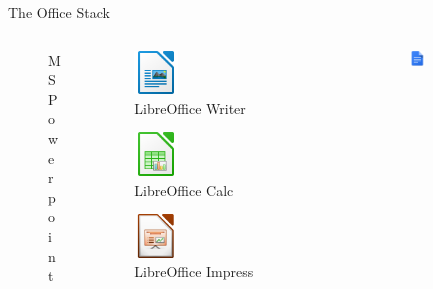 \documentclass[10pt]{beamer}
\begin{document}
\begin{frame}{The Office Stack}
\begin{columns}
\begin{column}{0.33\textwidth}
\begin{figure}
                    \caption{MS Powerpoint}
                \end{figure}
            \end{column}
            \begin{column}{0.33\textwidth}
                \begin{figure}
                    \centering
                    \includegraphics[width=0.25\textwidth]{images/libre-writer}
                    \caption{LibreOffice Writer}
                \end{figure}
                \begin{figure}
                    \centering
                    \includegraphics[width=0.25\textwidth]{images/libre-calc}
                    \caption{LibreOffice Calc}
                \end{figure}
                \begin{figure}
                    \centering
                    \includegraphics[width=0.25\textwidth]{images/libre-impress}
                    \caption{LibreOffice Impress}
                \end{figure}
            \end{column}
            \begin{column}{0.33\textwidth}
                \begin{figure}
                    \centering
                    \includegraphics[width=0.25\textwidth]{images/google-docs}

\end{figure}
\end{column}
\end{columns}
\end{frame}
\end{document}
